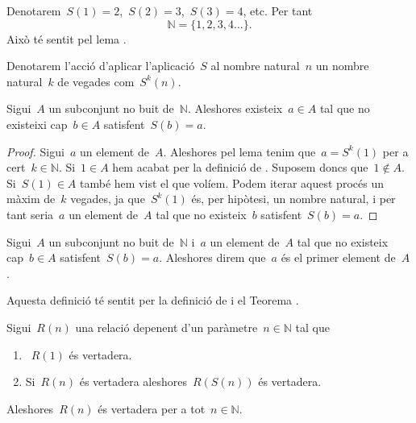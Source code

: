 \documentclass[../fonaments-de-les-matematiques.tex]{subfiles}
\begin{document}
    \begin{notation}
        Denotarem~\(S(1)=2\),~\(S(2)=3\),~\(S(3)=4\), etc.
        Per tant
        \[
            \mathbb{N}=\{1,2,3,4\dots\}.
        \]
        Això té sentit pel lema .
    \end{notation}
    \begin{notation}
        Denotarem l'acció d'aplicar l'aplicació~\(S\) al nombre natural~\(n\) un nombre natural~\(k\) de vegades com~\(S^{k}(n)\).
    \end{notation}
    \begin{theorem}
        \label{thm:primer-element}
        Sigui~\(A\) un subconjunt no buit de~\(\mathbb{N}\).
        Aleshores existeix~\(a\in A\) tal que no existeixi cap~\(b\in A\) satisfent~\(S(b)=a\).
    \end{theorem}
    \begin{proof}
        Sigui~\(a\) un element de~\(A\).
        Aleshores pel lema  tenim que~\(a=S^{k}(1)\) per a cert~\(k\in\mathbb{N}\).
        Si~\(1\in A\) hem acabat per la definició de .
        Suposem doncs que~\(1\notin A\).
        Si~\(S(1)\in A\) també hem vist el que volíem.
        Podem iterar aquest procés un màxim de~\(k\) vegades, ja que~\(S^{k}(1)\) és, per hipòtesi, un nombre natural, i per tant seria~\(a\) un element de~\(A\) tal que no existeix~\(b\) satisfent~\(S(b)=a\).
    \end{proof}
    \begin{definition}
        \label{def:primer-element}
        Sigui~\(A\) un subconjunt no buit de~\(\mathbb{N}\) i~\(a\) un element de~\(A\) tal que no existeix cap~\(b\in A\) satisfent~\(S(b)=a\).
        Aleshores direm que~\(a\) és el primer element de~\(A\).

        Aquesta definició té sentit per la definició de  i el Teorema .
    \end{definition}
    \begin{theorem}
        \label{thm:principi-dinduccio}
        Sigui~\(R(n)\) una relació depenent d'un paràmetre~\(n\in\mathbb{N}\) tal que
        \begin{enumerate}
            \item\label{enum:thm:principi-dinduccio-1}~\(R(1)\) és vertadera.
            \item\label{enum:thm:principi-dinduccio-2} Si~\(R(n)\) és vertadera aleshores~\(R(S(n))\) és vertadera.
        \end{enumerate}
        Aleshores~\(R(n)\) és vertadera per a tot~\(n\in\mathbb{N}\).
    \end{theorem}
\end{document}
